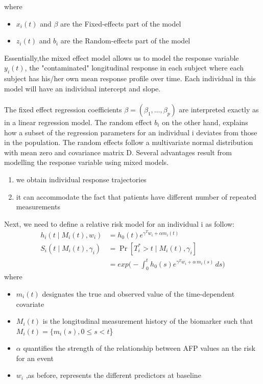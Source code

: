 \documentclass[11pt,twoside]{article}
\numberwithin{Theorem}{section}
\numberwithin{Definition}{section}
\numberwithin{Lemma}{section}
\numberwithin{Algorithm}{section}
\numberwithin{equation}{section}
\begin{document}
where
\begin{itemize}
    \item $x_i(t)$ and $\beta$ are the Fixed-effects part of the model
    \item $z_i(t)$ and $b_i$ are the Random-effects part of the model
\end{itemize}
Essentially,the mixed effect model allows us to model the response variable $y_i(t)$, the "contaminated" longitudinal response in each subject where each subject has his/her own mean response profile over time. Each individual in this model will have an individual intercept and slope. \\
\\
The fixed effect regression coefficients $\beta=(\beta_1,\dots,\beta_p)$ are interpreted exactly as in a linear regression model. The random effect $b_i$ on the other hand, explains how a subset of the regression parameters for an individual i deviates from those in the population. The random effects follow a multivariate normal distribution with mean zero and covariance matrix D.  Several advantages result from modelling the response variable using mixed models.
\begin{enumerate}
    \item we obtain individual response trajectories
    \item it can accommodate the fact that patients have different number of repeated measurements
\end{enumerate}
%
Next, we need to define a relative risk model for an individual i as follow:
\begin{align*}
    h_i(t \mid M_i(t),w_i) &= h_0(t)e^{\gamma^T w_i + \alpha m_i(t)} \\
    S_i(t\mid M_i(t),\gamma_i) &= \Pr[T_i^* > t\mid M_i(t), \gamma_i] \\
    &= exp \bigg( -\int_{0}^{t}h_0(s) e^{\gamma^T w_i + \alpha\, m_i(s)}\, ds \bigg )
\end{align*}
where
\begin{itemize}
    \item $m_i(t)$ designates the true and observed value of the time-dependent covariate
    \item $M_i(t)$ is the longitudinal measurement history of the biomarker such that \\ $M_i(t) = \{m_i(s),0 \leq s < t$\}
    \item $\alpha$ quantifies the strength of the relationship between AFP values an the risk for an event
    \item $w_i$ ,as before, represents the different predictors at baseline
\end{itemize}
\end{document}
